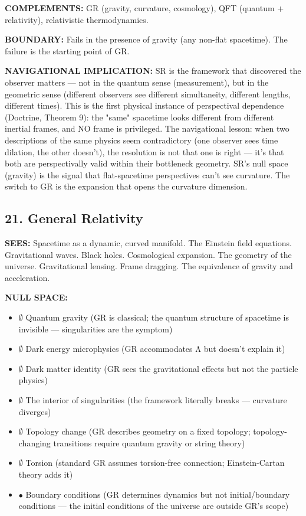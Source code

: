 \textbf{COMPLEMENTS:} GR (gravity, curvature, cosmology), QFT (quantum + relativity), relativistic thermodynamics.


\textbf{BOUNDARY:} Fails in the presence of gravity (any non-flat spacetime). The failure is the starting point of GR.


\textbf{NAVIGATIONAL IMPLICATION:} SR is the framework that discovered the observer matters — not in the quantum sense (measurement), but in the geometric sense (different observers see different simultaneity, different lengths, different times). This is the first physical instance of perspectival dependence (Doctrine, Theorem 9): the "same" spacetime looks different from different inertial frames, and NO frame is privileged. The navigational lesson: when two descriptions of the same physics seem contradictory (one observer sees time dilation, the other doesn't), the resolution is not that one is right — it's that both are perspectivally valid within their bottleneck geometry. SR's null space (gravity) is the signal that flat-spacetime perspectives can't see curvature. The switch to GR is the expansion that opens the curvature dimension.


\bigskip\noindent\makebox[\textwidth]{\color{rulegray}\rule{5cm}{0.3pt}}\bigskip


\subsection*{21. General Relativity}


\textbf{SEES:} Spacetime as a dynamic, curved manifold. The Einstein field equations. Gravitational waves. Black holes. Cosmological expansion. The geometry of the universe. Gravitational lensing. Frame dragging. The equivalence of gravity and acceleration.


\textbf{NULL SPACE:}

\begin{itemize}[nosep,leftmargin=*]
  \item $\emptyset$ Quantum gravity (GR is classical; the quantum structure of spacetime is invisible — singularities are the symptom)
  \item $\emptyset$ Dark energy microphysics (GR accommodates Λ but doesn't explain it)
  \item $\emptyset$ Dark matter identity (GR sees the gravitational effects but not the particle physics)
  \item $\emptyset$ The interior of singularities (the framework literally breaks — curvature diverges)
  \item $\emptyset$ Topology change (GR describes geometry on a fixed topology; topology-changing transitions require quantum gravity or string theory)
  \item $\emptyset$ Torsion (standard GR assumes torsion-free connection; Einstein-Cartan theory adds it)
  \item $\bullet$ Boundary conditions (GR determines dynamics but not initial/\allowbreak boundary conditions — the initial conditions of the universe are outside GR's scope)
\end{itemize}


